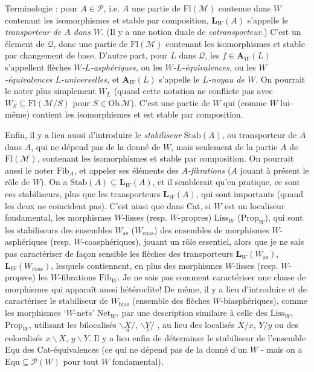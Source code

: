 \documentclass[11pt]{article}
\newcommand{\printedpage}[1]{\marginpar{\footnotesize p.~#1}}
\newcommand{\msp}[1]{\marginpar{\footnotesize [#1]}}
\newcommand{\Fl}{\mathrm{Fl}}
\newcommand{\Fib}{\mathrm{Fib}}
\begin{document}
Terminologie : pour $A \in \mathcal{P}$, i.e. $A$ une partie de $\Fl(\mathcal{M})$ contenue dans $W$ contenant les isomorphismes et stable par composition, $\mathbf{L}_W(A)$ s'appelle le \textit{transporteur de $A$ dans $W$}. (Il y a une notion duale de \textit{cotransporteur.}) C'est un élement de $\mathcal{Q}$, donc une partie de $\Fl(\mathcal{M})$ contenant les isomorphismes et stable par changement de base. D'autre part, pour $L$ dans $\mathcal{Q}$, les $f \in \mathbf{A}_W(L)$ s'appellent flèches \textit{$W$-$L$-asphériques,} ou les \textit{$W$-$L$-équivalences,} ou les \textit{$W$-équivalences $L$-universelles,} et $\mathbf{A}_W(L)$ s'appelle le \textit{$L$-noyau de $W$}. On pourrait le noter plus simplement $W_L$ (quand cette notation ne conflicte pas avec $W_S \subseteq \Fl(\mathcal{M}/S)$ pour $S \in \mathrm{Ob}\,\mathcal{M}$). C'est une partie de $W$ qui (comme $W$ lui-même) contient les isomorphismes et est stable par composition. %

Enfin, il y a lieu aussi d'introduire le \textit{stabiliseur} $\mathrm{Stab}(A)$, ou transporteur de $A$ dans $A$, qui ne dépend pas de la donné de $W$, mais seulement de la partie $A$ de $\Fl(\mathcal{M})$, contenant les isomorphismes et stable par composition. On pourrait aussi le noter $\Fib_A$, et appeler ses éléments des \textit{$A$-fibrations} ($A$ jouant à présent le rôle de $W$). On a $\mathrm{Stab}(A) \subseteq \mathbf{L}_W(A)$, et il semblerait qu'en %
\printedpage{55}
\msp{page 89}
pratique, ce sont ces stabiliseurs, plus que les transporteurs $\mathbf{L}_W(A)$, qui sont importants (quand les deux ne coïncident pas). C'est ainsi que dans Cat, si $W$ est un localiseur fondamental, les morphismes $W$-lisses (resp. $W$-propres) $\mathrm{Liss}_W$ ($\mathrm{Prop}_W$), qui sont les stabiliseurs des ensembles $W_{\mathrm{as}}$ ($W_{\mathrm{coas}}$) des ensembles de morphismes $W$-asphériques (resp. $W$-coasphériques), jouant un rôle essentiel, alors que je ne sais pas caractériser de façon sensible les flèches des transporteurs $\mathbf{L}_W(W_{\mathrm{as}})$, $\mathbf{L}_W(W_{\mathrm{coas}})$, lesquels contiennent, en plus des morphismes $W$-lisses (resp. $W$-propres) les $W$-fibrations $\Fib_W$. Je ne sais pas comment caractériser une classe de morphismes qui apparaît aussi hétéroclite! De même, il y a lieu d'introduire et de caractériser le stabiliseur de $W_{\mathrm{bias}}$ (ensemble des flèches $W$-biasphériques), comme les morphismes `$W$-nets' $\mathrm{Net}_W$, par une description similaire à celle des $\mathrm{Liss}_W$, $\mathrm{Prop}_W$, utilisant les bilocalisés $\backslash\underset{u}{X}/$, $\backslash\underset{v}{Y}/$ , au lieu des localisés $X/x$, $Y/y$ ou des colocalisés $x\backslash X$, $y\backslash Y$. Il y a lieu enfin de déterminer le stabiliseur de l'ensemble Equ des Cat-équivalences (ce qui ne dépend pas de la donné d'un $W$ - mais on a $\mathrm{Equ} \subseteq \mathcal{P}(W)$ pour tout $W$ fondamental). %
\end{document}
